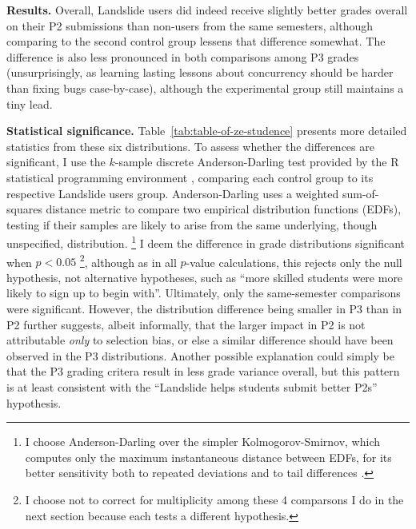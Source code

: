 {\bf Results.}
Overall,
Landslide users did indeed receive
slightly better grades overall on their P2 submissions than non-users from the same semesters,
although comparing to the second control group lessens that difference somewhat.
The difference is also less pronounced in both comparisons among P3 grades
(unsurprisingly, as learning lasting lessons about concurrency should be harder than fixing bugs case-by-case),
although the experimental group still maintains a tiny lead.

{\bf Statistical significance.}
Table~\ref{tab:table-of-ze-studence} presents more detailed statistics from these six distributions.
To assess whether the differences are significant,
I use the $k$-sample discrete Anderson-Darling test \cite{anderson1952,anderson-darling}
provided by the R statistical programming environment \cite{r-lang,r-ksamples},
comparing each control group to its respective Landslide users group.
Anderson-Darling uses a weighted sum-of-squares distance metric to compare two empirical distribution functions (EDFs),
testing if their samples are likely to arise from the same underlying, though unspecified, distribution.%
\footnote{
I choose Anderson-Darling over the simpler Kolmogorov-Smirnov,
which computes only the maximum instantaneous distance between EDFs,
for its better sensitivity both to repeated deviations and to tail differences \cite{beware-kolmogorov-smirnov}.
}
I deem the difference in grade distributions significant when $p < 0.05$%
\footnote{I choose not to correct for multiplicity among these 4 comparsons  I do in the next section
because each tests a different hypothesis.
},
although as in all $p$-value calculations,
this rejects only the null hypothesis,
not alternative hypotheses,
such as ``more skilled students were more likely to sign up to begin with''.
%
Ultimately, only the same-semester comparisons were significant.
However, the distribution difference being smaller in P3 than in P2
further suggests, albeit informally,
that the larger impact in P2 is not attributable {\em only} to selection bias,
or else a similar difference should have been observed in the P3 distributions.
Another possible explanation could simply be that the P3 grading critera result in less grade variance overall,
but this pattern is at least consistent with the ``Landslide helps students submit better P2s'' hypothesis.

